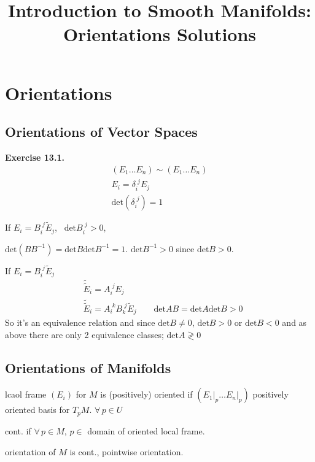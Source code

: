\documentclass[11pt]{amsart}
\title{Introduction to Smooth Manifolds: Orientations Solutions}
\theoremstyle{definition}
\newcommand{\exercisehead}[1]{\medskip\noindent\textbf{Exercise #1.} }
\begin{document}
\maketitle
\section{Orientations}
\subsection*{ Orientations of Vector Spaces }

\exercisehead{13.1}
\[
\begin{gathered}
  (E_1 \dots E_n) \sim (E_1 \dots E_n) \\
  E_i = \delta_i^{\, \, j } E_j \\
  \text{det}{ (\delta_i^{\, \, j} )} = 1
\end{gathered}
\]

If $E_i = B_i^{\, \, j} \widetilde{E}_j$, \, $\text{det}{B_i^{\, \, j }} >0$,

$\text{det}{(BB^{-1})} = \text{det}{B} \text{det}{B^{-1}} = 1$.  $\text{det}{B^{-1}} >0$ since $\text{det}{B} >0$.

If $E_i = B_i^{\, \, j} \widetilde{E}_j$
\[
\begin{aligned}
  & \widetilde{ \widetilde{E}}_i = A_i^{\, \, j} E_j \\
  & \widetilde{ \widetilde{E}}_i = A_i^{\, \, k } B_k^{\, \, j} \widetilde{E}_j \quad \quad \text{det}{AB} = \text{det}{A} \text{det}{B} >0
\end{aligned}
\]
So it's an equivalence relation and since $\text{det}{B} \neq 0$, $\text{det}{B} >0$ or $\text{det}{B} <0$ and as above there are only 2 equivalence classes; $\text{det}{A} \gtrless 0$

\subsection*{ Orientations of Manifolds }

lcaol frame $(E_i)$ for $M$ is (positively) oriented if $(\left. E_1 \right|_p \dots \left. E_n \right|_p)$ positively oriented basis for $T_pM$.  $\forall \, p \in U$

cont. if $\forall \, p \in M$, $p\in $ domain of oriented local frame.

orientation of $M$ is cont., pointwise orientation.
\end{document}
